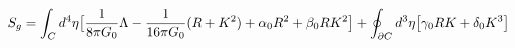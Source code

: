 \begin{equation}
S_g = \int_Cd^4\eta\big{[}\frac{1}{8\pi G_0}\Lambda - \frac{1}{16\pi G_0}(R + K^2) + \alpha_0R^2 + \beta_0RK^2\big{]}
+ \oint_{\partial C}d^3\eta\big{[}\gamma_0RK + \delta_0K^3\big{]}
\end{equation} 
